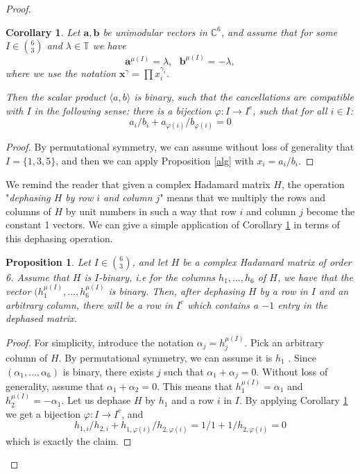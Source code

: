 \documentclass[12pt]{amsart}
\numberwithin{equation}{section}
\newcommand{\stb}{,\ldots,}
\newcommand{\bra}{\langle}
\newcommand{\ket}{\rangle}
\newcommand{\al}{\alpha}
\newcommand{\ga}{\gamma}
\newcommand{\la}{\lambda}
\newtheorem{proposition}[fact]{Proposition}
\newtheorem{corollary}[fact]{Corollary}
\theoremstyle{definition}
\theoremstyle{remark}
\theoremstyle{remark}
\newcommand{\TT}{\ensuremath{\mathbb{T}}}
\newcommand{\CC}{\ensuremath{\mathbb{C}}}
\newcommand{\bv}{\ensuremath{\mathbf{b}}}
\newcommand{\av}{\ensuremath{\mathbf{a}}}
\newcommand{\xb}{\ensuremath{\mathbf{x}}}
\begin{document}
\begin{proof}
\begin{corollary}\label{cor:RHtoscalar}
	Let $\av, \bv$ be unimodular vectors in $\CC^6$, and assume that for some $I\in\binom{6}{3}$ and $\la\in \TT$ we have
	\[\av^{\mu(I)}=\la, \ \ \ \bv^{\mu(I)}=-\la,
    \]
	where we use the notation $\xb^\ga=\prod x_i^{\ga_i}$.
	
	Then the scalar product $\bra a, b\ket$ is binary,  such that the cancellations are compatible with $I$ in the following sense: there is a bijection $\varphi:I\to I^c$, such that for all $i\in I$:
	\[
	a_i/b_{i}+a_{\varphi(i)}/b_{\varphi(i)}=0
	\]
\end{corollary}
\begin{proof}
By permutational symmetry, we can assume without loss of generality that $I=\{1,3,5\}$, and then we can apply Proposition \ref{alg} with   $x_i=a_i/b_i$.
\end{proof}

We remind the reader that given a complex Hadamard matrix $H$, the operation "{\it dephasing $H$ by row $i$ and column $j$}" means that we multiply the rows and columns of $H$ by unit numbers in such a way that row $i$ and column $j$ become the constant 1 vectors. We can give a simple application of  Corollary \ref{cor:RHtoscalar} in terms of this dephasing operation. 

\begin{proposition}\label{prop:row_minus_one}
	Let $I\in \binom{6}{3}$, and let $H$ be a complex Hadamard matrix of order 6. Assume that $H$ is $I$-binary, i.e for the columns $h_1, \dots, h_6$ of $H$, we have that the vector  $(h_1^{\mu(I)}, \dots, h_6^{\mu(I)}$ is binary. Then, after dephasing $H$ by a row in $I$ and an arbitrary column, there will be a row in $I^c$ which contains a $-1$ entry in the dephased matrix. 
\end{proposition}
\begin{proof}
For simplicity, introduce the notation $\alpha_j=h_j^{\mu(I)}$. 
Pick an arbitrary column of $H$. By permutational symmetry, we can assume it is $h_1$ .
	Since $(\al_1\stb \al_6)$ is binary, there exists $j$ such that $\al_1+\al_j=0$. Without loss of generality, assume that $\al_1+\al_2=0$. This means that $h_1^{\mu(I)}=\al_1$ and  $h_2^{\mu(I)}=-\al_1$. Let us dephase $H$ by $h_1$ and a row $i$ in $I$. By applying Corollary \ref{cor:RHtoscalar} we get a bijection $\varphi:I\to I^c$,  and \[h_{1,i}/h_{2,i}+h_{1,\varphi(i)}/h_{2,\varphi(i)}=1/1+1/h_{2,\varphi(i)}=0\] which is exactly the claim.
\end{proof}


\end{proof}
\end{document}
